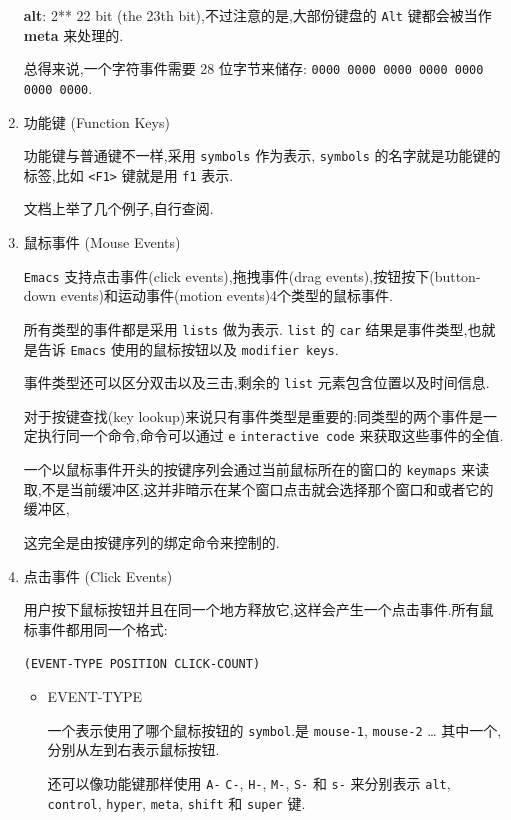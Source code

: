 \documentclass[11pt]{article}
\begin{document}
\begin{enumerate}
\textbf{alt}: 2** 22 bit (the 23th bit),不过注意的是,大部份键盘的 \texttt{Alt} 键都会被当作 \textbf{meta} 来处理的.

总得来说,一个字符事件需要 28 位字节来储存: \texttt{0000 0000 0000 0000 0000 0000 0000}.


\item 功能键 (Function Keys)
\label{sec:orge0945b9}

功能键与普通键不一样,采用 \texttt{symbols} 作为表示, \texttt{symbols} 的名字就是功能键的标签,比如 \texttt{<F1>} 键就是用 \texttt{f1} 表示.

文档上举了几个例子,自行查阅.


\item 鼠标事件 (Mouse Events)
\label{sec:org11801ed}

\texttt{Emacs} 支持点击事件(click events),拖拽事件(drag events),按钮按下(button-down events)和运动事件(motion events)4个类型的鼠标事件.

所有类型的事件都是采用 \texttt{lists} 做为表示. \texttt{list} 的 \texttt{car} 结果是事件类型,也就是告诉 \texttt{Emacs} 使用的鼠标按钮以及 \texttt{modifier keys}.

事件类型还可以区分双击以及三击,剩余的 \texttt{list} 元素包含位置以及时间信息.

对于按键查找(key lookup)来说只有事件类型是重要的:同类型的两个事件是一定执行同一个命令,命令可以通过 \texttt{e} \texttt{interactive code} 来获取这些事件的全值.

一个以鼠标事件开头的按键序列会通过当前鼠标所在的窗口的 \texttt{keymaps} 来读取,不是当前缓冲区,这并非暗示在某个窗口点击就会选择那个窗口和或者它的缓冲区,

这完全是由按键序列的绑定命令来控制的.


\item 点击事件 (Click Events)
\label{sec:org15c047a}

用户按下鼠标按钮并且在同一个地方释放它,这样会产生一个点击事件.所有鼠标事件都用同一个格式:

\texttt{(EVENT-TYPE POSITION CLICK-COUNT)}

\begin{itemize}
\item EVENT-TYPE

一个表示使用了哪个鼠标按钮的 \texttt{symbol}.是 \texttt{mouse-1}, \texttt{mouse-2} \ldots{} 其中一个,分别从左到右表示鼠标按钮.

还可以像功能键那样使用 \texttt{A-} \texttt{C-}, \texttt{H-}, \texttt{M-}, \texttt{S-} 和 \texttt{s-} 来分别表示 \texttt{alt}, \texttt{control}, \texttt{hyper}, \texttt{meta}, \texttt{shift} 和 \texttt{super} 键.


\end{itemize}
\end{enumerate}
\end{document}
